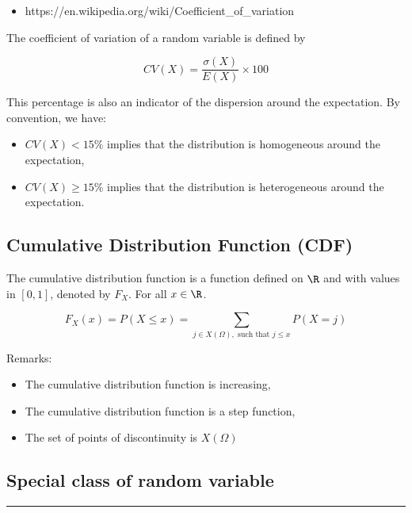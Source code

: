 \documentclass[
  letterpaper,
  DIV=11,
  numbers=noendperiod]{scrreprt}
\providecommand{\tightlist}{%
  \setlength{\itemsep}{0pt}\setlength{\parskip}{0pt}}\usepackage{longtable,booktabs,array}
\begin{document}
\begin{itemize}
\tightlist
\item
  https://en.wikipedia.org/wiki/Coefficient\_of\_variation
\end{itemize}

The coefficient of variation of a random variable is defined by

\[CV(X) = \frac{\sigma(X)}{E(X)} \times 100\]

This percentage is also an indicator of the dispersion around the
expectation. By convention, we have:

\begin{itemize}
\tightlist
\item
  \(CV(X) < 15\%\) implies that the distribution is homogeneous around
  the expectation,
\item
  \(CV(X) \geq 15\%\) implies that the distribution is heterogeneous
  around the expectation.
\end{itemize}

\subsection{Cumulative Distribution Function
(CDF)}\label{cumulative-distribution-function-cdf}

The cumulative distribution function is a function defined on \(\R\) and
with values in \([0,1]\), denoted by \(F_X\). For all \(x \in \R\).

\[F_X(x) = P(X \leq x) = \sum \limits_{j \in X(\Omega), \text{ such that } j \leq x} P(X = j)\]

Remarks:

\begin{itemize}
\tightlist
\item
  The cumulative distribution function is increasing,
\item
  The cumulative distribution function is a step function,
\item
  The set of points of discontinuity is \(X(\Omega)\)
\end{itemize}

\subsection{Special class of random
variable}\label{special-class-of-random-variable}

\begin{center}\rule{0.5\linewidth}{0.5pt}\end{center}
\end{document}

